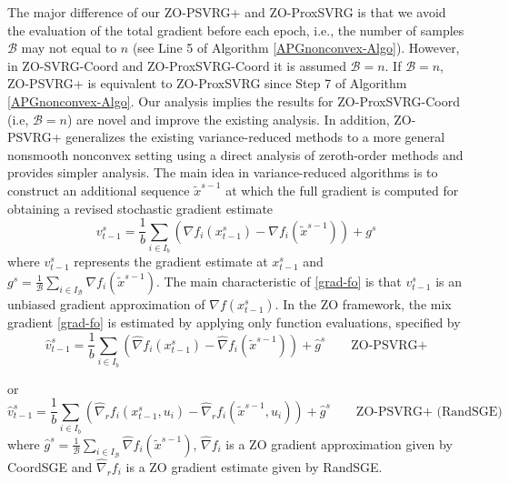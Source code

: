 \documentclass{article}
\theoremstyle{definition}
\theoremstyle{remark}
\begin{document}
The major difference of our ZO-PSVRG+  and ZO-ProxSVRG is that we avoid the evaluation of the total gradient before each epoch, i.e., the number of samples $\mathcal{B}$ may not equal to $n$ (see Line 5 of Algorithm \ref{APGnonconvex-Algo}).  However, in ZO-SVRG-Coord and ZO-ProxSVRG-Coord it is assumed $\mathcal{B} = n$. If $\mathcal{B} = n$, ZO-PSVRG+ is equivalent to ZO-ProxSVRG  since Step 7 of Algorithm \ref{APGnonconvex-Algo}. Our analysis implies the results for ZO-ProxSVRG-Coord (i.e, $\mathcal{B} = n$) are novel and improve the existing analysis. In addition, ZO-PSVRG+ generalizes the existing variance-reduced methods to a more general nonsmooth nonconvex setting using a direct  analysis of zeroth-order methods and provides simpler analysis. The main idea in variance-reduced algorithms is to construct an additional sequence $\tilde{x}^{s-1}$ at which the full gradient is computed for obtaining  a revised stochastic gradient estimate
\begin{equation}\label{grad-fo}
{{v}}_{t-1}^s = \frac{1}{b} \sum_{i\in I_b}\left({\nabla} f_{i}(x_{t-1}^s)-{\nabla} f_{i}(\tilde{x}^{s-1})\right)+{g}^s
\end{equation}
where ${{v}}_{t-1}^s$ represents the gradient estimate at $x_{t-1}^s$ and  ${g}^s= \frac{1}{\mathcal{B}}\sum_{i\in I_{\mathcal{B}}}{\nabla} f_{i}(\tilde{x}^{s-1})$. The main characteristic of \eqref{grad-fo} is that ${{v}}_{t-1}^s$ is an unbiased gradient approximation of $\nabla f(x_{t-1}^s)$. In the ZO framework, the mix gradient \eqref{grad-fo} is estimated by applying only function evaluations, specified by
\begin{equation}\label{zo-grad-fo}
{\hat{v}}_{t-1}^s = \frac{1}{b} \sum_{i\in I_b}\left(\hat{\nabla} f_{i}(x_{t-1}^s)-\hat{\nabla} f_{i}(\tilde{x}^{s-1})\right)+\hat{g}^s\qquad\text{ZO-PSVRG+}
\end{equation}

or 
\begin{equation}\label{zo-grad-fo-rand}
{\hat{v}}_{t-1}^s = \frac{1}{b} \sum_{i\in I_b}\left(\hat{\nabla}_r f_{i}(x_{t-1}^s, u_i)-\hat{\nabla}_r f_{i}(\tilde{x}^{s-1}, u_i)\right)+\hat{g}^s\qquad\text{ZO-PSVRG+ (RandSGE)}
\end{equation}
where $\hat{g}^s= \frac{1}{\mathcal{B}}\sum_{i\in I_{\mathcal{B}}}\hat{\nabla} f_{i}(\tilde{x}^{s-1})$,   $\hat{\nabla} f_{i}$ is a ZO gradient approximation given by CoordSGE and $\hat{\nabla}_r f_{i}$ is a ZO gradient estimate given by RandSGE.  
\end{document}
